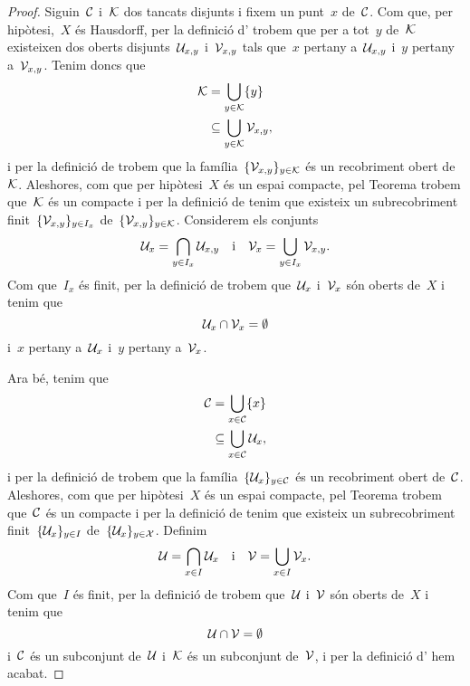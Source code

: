 \documentclass[../../main.tex]{subfiles}
\begin{document}
    \begin{proof} %
        Siguin~\(\mathcal{C}\) i~\(\mathcal{K}\) dos tancats disjunts i fixem un punt~\(x\) de~\(\mathcal{C}\).
        Com que, per hipòtesi,~\(X\) és Hausdorff, per la definició d' trobem que per a tot~\(y\) de~\(\mathcal{K}\) existeixen dos oberts disjunts~\(\mathcal{U}_{x,y}\) i~\(\mathcal{V}_{x,y}\) tals que~\(x\) pertany a~\(\mathcal{U}_{x,y}\) i~\(y\) pertany a~\(\mathcal{V}_{x,y}\).
        Tenim doncs que
        \begin{align*}
            \mathcal{K}&=\bigcup_{y\in\mathcal{K}}\{y\} \\
            &\subseteq\bigcup_{y\in\mathcal{K}}\mathcal{V}_{x,y},
        \end{align*}
        i per la definició de  trobem que la família~\(\{\mathcal{V}_{x,y}\}_{y\in\mathcal{K}}\) és un recobriment obert de~\(\mathcal{K}\).
        Aleshores, com que per hipòtesi~\(X\) és un espai compacte, pel Teorema  trobem que~\(\mathcal{K}\) és un compacte i per la definició de  tenim que existeix un subrecobriment finit~\(\{\mathcal{V}_{x,y}\}_{y\in I_{x}}\) de~\(\{\mathcal{V}_{x,y}\}_{y\in\mathcal{K}}\).
        Considerem els conjunts
        \[
            \mathcal{U}_{x}=\bigcap_{y\in I_{x}}\mathcal{U}_{x,y}\quad\text{i}\quad\mathcal{V}_{x}=\bigcup_{y\in I_{x}}\mathcal{V}_{x,y}.
        \]
        Com que~\(I_{x}\) és finit, per la definició de  trobem que~\(\mathcal{U}_{x}\) i~\(\mathcal{V}_{x}\) són oberts de~\(X\) i tenim que
        \[
            \mathcal{U}_{x}\cap\mathcal{V}_{x}=\emptyset
        \]
        i~\(x\) pertany a~\(\mathcal{U}_{x}\) i~\(y\) pertany a~\(\mathcal{V}_{x}\).

        Ara bé, tenim que
        \begin{align*}
            \mathcal{C}&=\bigcup_{x\in\mathcal{C}}\{x\} \\
            &\subseteq\bigcup_{x\in\mathcal{C}}\mathcal{U}_{x},
        \end{align*}
        i per la definició de  trobem que la família~\(\{\mathcal{U}_{x}\}_{y\in\mathcal{C}}\) és un recobriment obert de~\(\mathcal{C}\).
        Aleshores, com que per hipòtesi~\(X\) és un espai compacte, pel Teorema  trobem que~\(\mathcal{C}\) és un compacte i per la definició de  tenim que existeix un subrecobriment finit~\(\{\mathcal{U}_{x}\}_{y\in I}\) de~\(\{\mathcal{U}_{x}\}_{y\in\mathcal{X}}\).
        Definim
        \[
            \mathcal{U}=\bigcap_{x\in I}\mathcal{U}_{x}\quad\text{i}\quad\mathcal{V}=\bigcup_{x\in I}\mathcal{V}_{x}.
        \]
        Com que~\(I\) és finit, per la definició de  trobem que~\(\mathcal{U}\) i~\(\mathcal{V}\) són oberts de~\(X\) i tenim que
        \[
            \mathcal{U}\cap\mathcal{V}=\emptyset
        \]
        i~\(\mathcal{C}\) és un subconjunt de~\(\mathcal{U}\) i~\(\mathcal{K}\) és un subconjunt de~\(\mathcal{V}\), i per la definició d' hem acabat.
    \end{proof}
\end{document}
